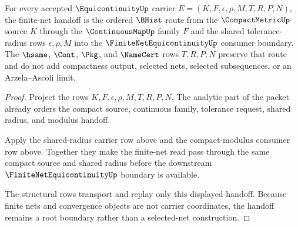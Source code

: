 \begin{theorem}
\label{thm:equicontinuity-root-unblock-finite-net-handoff}
For every accepted $\EquicontinuityUp$ carrier $E=(K,F,\epsilon,\rho,M,T,R,P,N)$, the finite-net handoff is the ordered $\BHist$ route from the $\CompactMetricUp$ source $K$ through the $\ContinuousMapUp$ family $F$ and the shared tolerance-radius rows $\epsilon,\rho,M$ into the $\FiniteNetEquicontinuityUp$ consumer boundary. The $\hsame$, $\Cont$, $\Pkg$, and $\NameCert$ rows $T,R,P,N$ preserve that route and do not add compactness output, selected nets, selected subsequences, or an Arzela--Ascoli limit.
\end{theorem}
\begin{proof}
Project the rows $K,F,\epsilon,\rho,M,T,R,P,N$. The analytic part of the packet already orders the compact source, continuous family, tolerance request, shared radius, and modulus handoff.

Apply the shared-radius carrier row above and the compact-modulus consumer row above. Together they make the finite-net read pass through the same compact source and shared radius before the downstream $\FiniteNetEquicontinuityUp$ boundary is available.

The structural rows transport and replay only this displayed handoff. Because finite nets and convergence objects are not carrier coordinates, the handoff remains a root boundary rather than a selected-net construction.
\end{proof}

